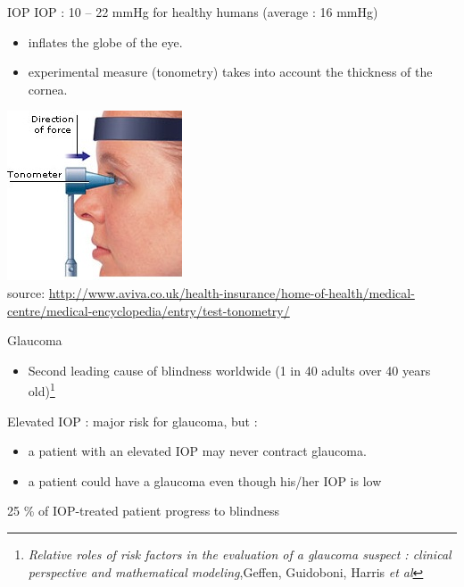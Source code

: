 \begin{frame}{IOP}
IOP : 10 -- 22 mmHg for healthy humans (average : 16 mmHg)
\begin{itemize}
\item inflates the globe of the eye.
\item experimental measure (tonometry) takes into account the thickness of the cornea.
\end{itemize}
%
%
\begin{center}
\includegraphics[scale=.6]{Tonometry.jpg}\\
\tiny{source: \url{http://www.aviva.co.uk/health-insurance/home-of-health/medical-centre/medical-encyclopedia/entry/test-tonometry/}}
\end{center}
\end{frame}

\begin{frame}{Glaucoma}
\begin{itemize}
\item Second leading cause of blindness worldwide (1 in 40 adults over 40 years old)\footnote{\textit{Relative roles of risk factors in the evaluation of a glaucoma suspect : clinical perspective and mathematical modeling},Geffen, Guidoboni, Harris \textit{et al}}
\end{itemize}
Elevated IOP : major risk for glaucoma, but :
\begin{itemize}
\item a patient with an elevated IOP may never contract glaucoma.
\item a patient could have a glaucoma even though his/her IOP is low
\end{itemize}
\begin{center}
\alert{ 25 \% of IOP-treated patient progress to blindness}

\end{center}

\end{frame}

